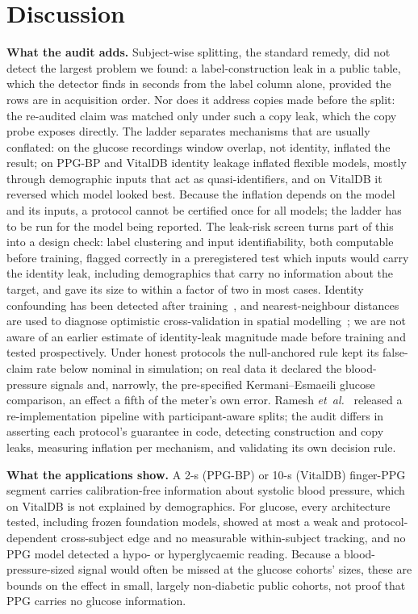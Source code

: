 \documentclass[journal]{IEEEtran}
\begin{document}
\section{Discussion}
\textbf{What the audit adds.}  Subject-wise splitting, the standard remedy,
did not detect the largest problem we found: a label-construction leak in a
public table, which the detector finds in seconds from the label column
alone, provided the rows are in acquisition order.  Nor does it address
copies made before the split: the re-audited claim was matched only under
such a copy leak, which the copy probe exposes directly.  The ladder
separates mechanisms that are usually conflated: on the glucose recordings
window overlap, not identity, inflated the result; on PPG-BP and VitalDB
identity leakage inflated flexible models, mostly through demographic
inputs that act as quasi-identifiers, and on VitalDB it reversed which
model looked best.  Because the inflation depends on the model and its
inputs, a protocol cannot be certified once for all models; the ladder has
to be run for the model being reported.  The leak-risk screen turns part of this
into a design check: label clustering and input identifiability, both
computable before training, flagged correctly in a preregistered test which
inputs would carry the identity leak, including demographics that carry no
information about the target, and gave its size to within a factor of two
in most cases.  Identity confounding has been detected after
training~\cite{chaibubneto2019}, and nearest-neighbour distances are used to
diagnose optimistic cross-validation in spatial
modelling~\cite{mila2022nndm,meyer2019spatial}; we are not aware of an earlier
estimate of identity-leak magnitude made before training and tested
prospectively.  Under honest protocols the
null-anchored rule kept its false-claim rate below nominal in simulation; on
real data it declared the blood-pressure signals and, narrowly, the
pre-specified Kermani--Esmaeili glucose comparison, an effect a fifth of
the meter's own error.  Ramesh \emph{et~al.}~\cite{ramesh2026} released a
re-implementation pipeline with participant-aware splits; the audit differs
in asserting each protocol's guarantee in code, detecting construction and
copy leaks, measuring inflation per mechanism, and validating its own
decision rule.

\textbf{What the applications show.}  A 2-s (PPG-BP) or 10-s (VitalDB)
finger-PPG segment carries calibration-free information about systolic
blood pressure, which on VitalDB is not explained by demographics.  For
glucose, every architecture tested, including frozen foundation models,
showed at most a weak and protocol-dependent cross-subject edge and no
measurable within-subject tracking, and no PPG model detected a hypo- or
hyperglycaemic reading.  Because a blood-pressure-sized signal would often
be missed at the glucose cohorts' sizes, these are bounds on the effect in
small, largely non-diabetic public cohorts, not proof that PPG carries no
glucose information.
\end{document}
